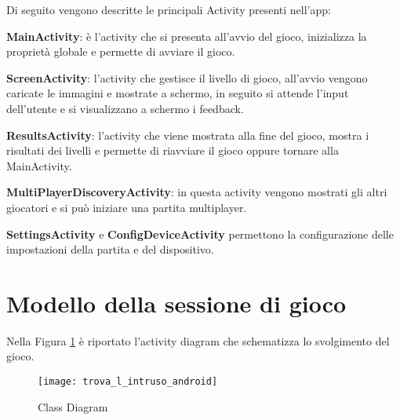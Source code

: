 \noindent Di seguito vengono descritte le principali Activity presenti nell'app:

\begin{description}
\item \textbf{MainActivity}: \`{e} l'activity che si presenta all'avvio del gioco, inizializza la propriet\`{a} globale  e permette di avviare il gioco.
\item \textbf{ScreenActivity}: l'activity che gestisce il livello di gioco, all'avvio vengono caricate le immagini e mostrate a schermo, in seguito si attende l'input dell'utente e si visualizzano a schermo i feedback.
\item \textbf{ResultsActivity}: l'activity che viene mostrata alla fine del gioco, mostra i risultati dei livelli e permette di riavviare il gioco oppure tornare alla MainActivity.
\item \textbf{MultiPlayerDiscoveryActivity}: in questa activity vengono mostrati gli altri giocatori e si pu\`{o} iniziare una partita multiplayer.
\item \textbf{SettingsActivity} e \textbf{ConfigDeviceActivity} permettono la configurazione delle impostazioni della partita e del dispositivo.
\end{description}

\section{Modello della sessione di gioco}

\noindent
Nella Figura \ref{fig:activity_diagram} \`{e} riportato l'activity diagram che schematizza lo svolgimento del gioco.

\begin{figure}
	\centering
    \texttt{[image: trova\_l\_intruso\_android]}
	\caption{Class Diagram}
	\label{fig:activity_diagram}
\end{figure}


